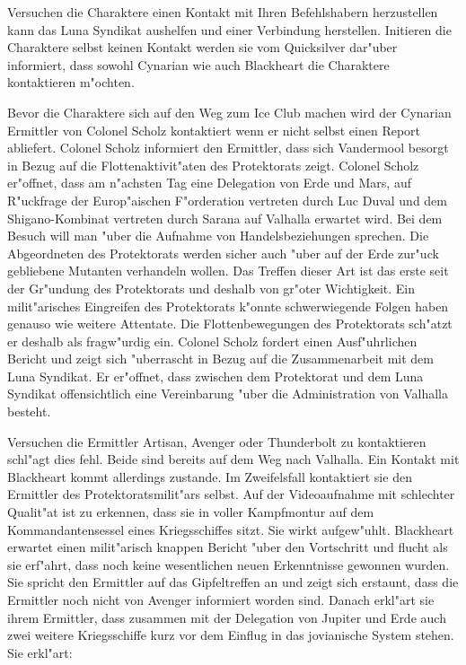 Versuchen die Charaktere einen Kontakt mit Ihren Befehlshabern herzustellen kann das Luna Syndikat aushelfen und einer Verbindung herstellen. Initieren die Charaktere selbst keinen Kontakt werden sie vom Quicksilver dar"uber informiert, dass sowohl Cynarian wie auch Blackheart die Charaktere kontaktieren m"ochten.

Bevor die Charaktere sich auf den Weg zum Ice Club machen wird der Cynarian Ermittler von Colonel Scholz kontaktiert wenn er nicht selbst einen Report abliefert. Colonel Scholz informiert den Ermittler, dass sich Vandermool besorgt in Bezug auf die Flottenaktivit"aten des Protektorats zeigt. Colonel Scholz er"offnet, dass am n"achsten Tag eine Delegation von Erde und Mars, auf R"uckfrage der Europ"aischen F"orderation vertreten durch Luc Duval und dem Shigano-Kombinat vertreten durch Sarana auf Valhalla erwartet wird. Bei dem Besuch will man "uber die Aufnahme von Handelsbeziehungen sprechen. Die Abgeordneten des Protektorats werden sicher auch "uber auf der Erde zur"uck gebliebene Mutanten verhandeln wollen. Das Treffen dieser Art ist das erste seit der Gr"undung des Protektorats und deshalb von gr"o\3ter Wichtigkeit. Ein milit"arisches Eingreifen des Protektorats k"onnte schwerwiegende Folgen haben genauso wie weitere Attentate. Die Flottenbewegungen des Protektorats sch"atzt er deshalb als fragw"urdig ein. Colonel Scholz fordert einen Ausf"uhrlichen Bericht und zeigt sich "uberrascht in Bezug auf die Zusammenarbeit mit dem Luna Syndikat. Er er"offnet, dass zwischen dem Protektorat und dem Luna Syndikat offensichtlich eine Vereinbarung "uber die Administration von Valhalla besteht.

Versuchen die Ermittler Artisan, Avenger oder Thunderbolt zu kontaktieren schl"agt dies fehl. Beide sind bereits auf dem Weg nach Valhalla. Ein Kontakt mit Blackheart kommt allerdings zustande. Im Zweifelsfall kontaktiert sie den Ermittler des Protektoratsmilit"ars selbst. Auf der Videoaufnahme mit schlechter Qualit"at ist zu erkennen, dass sie in voller Kampfmontur auf dem Kommandantensessel eines Kriegsschiffes sitzt. Sie wirkt aufgew"uhlt. Blackheart erwartet einen milit"arisch knappen Bericht "uber den Vortschritt und flucht als sie erf"ahrt, dass noch keine wesentlichen neuen Erkenntnisse gewonnen wurden. Sie spricht den Ermittler auf das Gipfeltreffen an und zeigt sich erstaunt, dass die Ermittler noch nicht von Avenger informiert worden sind. Danach erkl"art sie ihrem Ermittler, dass zusammen mit der Delegation von Jupiter und Erde auch zwei weitere Kriegsschiffe kurz vor dem Einflug in das jovianische System stehen. Sie erkl"art:

